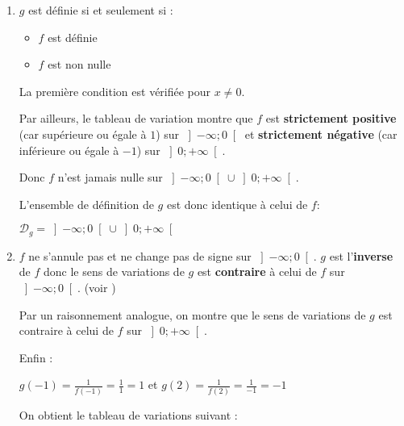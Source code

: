 \begin{corrige}
     \begin{enumerate}
          \item
          $g$ est définie si et seulement si :
          \begin{itemize}
               \item
               $f $ est définie
               \item
               $ f $ est non nulle
          \end{itemize}
          La première condition est vérifiée pour $x\neq 0$.
          \par
          Par ailleurs, le tableau de variation montre que $f$ est \textbf{strictement positive} (car supérieure ou égale à $1$) sur $\left]-\infty  ; 0\right[$ et \textbf{strictement négative} (car inférieure ou égale à $-1$) sur $\left]0 ; +\infty \right[$.
          \par
          Donc $f$ n'est jamais nulle sur $\left]-\infty  ; 0\right[ \cup  \left]0 ; +\infty \right[$.
          \par
          L'ensemble de définition de $g$ est donc identique à celui de $f$:
          \begin{center}$\mathscr D_{g}=\left]-\infty  ; 0\right[ \cup  \left]0 ; +\infty \right[$\end{center}
          \item
          $f$ ne s'annule pas et ne change pas de signe sur $\left]-\infty  ; 0\right[$. $g$ est l'\textbf{inverse} de $f$ donc le sens de variations de $g$ est  \textbf{contraire} à celui de $f$ sur $\left]-\infty  ; 0\right[$. (voir )
          \par
          Par un raisonnement analogue, on montre que le sens de variations de $g$ est  contraire à celui de $f$ sur $\left]0 ; +\infty \right[$.
          \par
          Enfin :
          \par
          $g\left(-1\right)=\frac{1}{f\left(-1\right)}=\frac{1}{1}=1$ et $g\left(2\right)=\frac{1}{f\left(2\right)}=\frac{1}{-1}=-1$
          \par
          On obtient le tableau de variations suivant :
          \par
\begin{center}

\end{center}
\end{enumerate}
\end{corrige}
